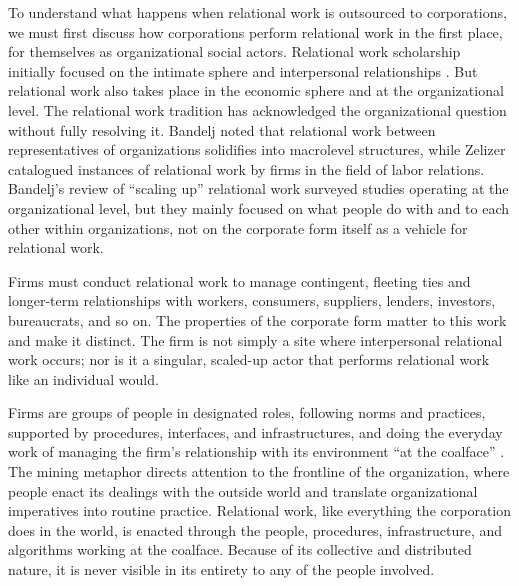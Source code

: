 \documentclass[
]{article}
\begin{document}
To understand what happens when relational work is outsourced to corporations, we must first discuss how corporations perform relational work in the first place, for themselves as organizational social actors. Relational work scholarship initially focused on the intimate sphere and interpersonal relationships \autocite[see][for a review]{bandeljRelationalWorkEconomy2020}. But relational work also takes place in the economic sphere and at the organizational level. The relational work tradition has acknowledged the organizational question without fully resolving it. Bandelj \autocite*{bandeljRelationalWorkEconomic2012} noted that relational work between representatives of organizations solidifies into macrolevel structures, while Zelizer \autocite*[156-157]{zelizerHowBecameRelational2012} catalogued instances of relational work by firms in the field of labor relations. Bandelj's \autocite*{bandeljRelationalWorkEconomy2020} review of ``scaling up'' relational work surveyed studies operating at the organizational level, but they mainly focused on what people do with and to each other within organizations, not on the corporate form itself as a vehicle for relational work.

Firms must conduct relational work to manage contingent, fleeting ties and longer-term relationships with workers, consumers, suppliers, lenders, investors, bureaucrats, and so on. The properties of the corporate form matter to this work and make it distinct. The firm is not simply a site where interpersonal relational work occurs; nor is it a singular, scaled-up actor that performs relational work like an individual would.

Firms are groups of people in designated roles, following norms and practices, supported by procedures, interfaces, and infrastructures, and doing the everyday work of managing the firm's relationship with its environment ``at the coalface'' \autocite{grayGoverningOrganizationInterpreting2014,huisingNudgeCultureBack2018}. The mining metaphor directs attention to the frontline of the organization, where people enact its dealings with the outside world and translate organizational imperatives into routine practice. Relational work, like everything the corporation does in the world, is enacted through the people, procedures, infrastructure, and algorithms working at the coalface. Because of its collective and distributed nature, it is never visible in its entirety to any of the people involved.
\end{document}

